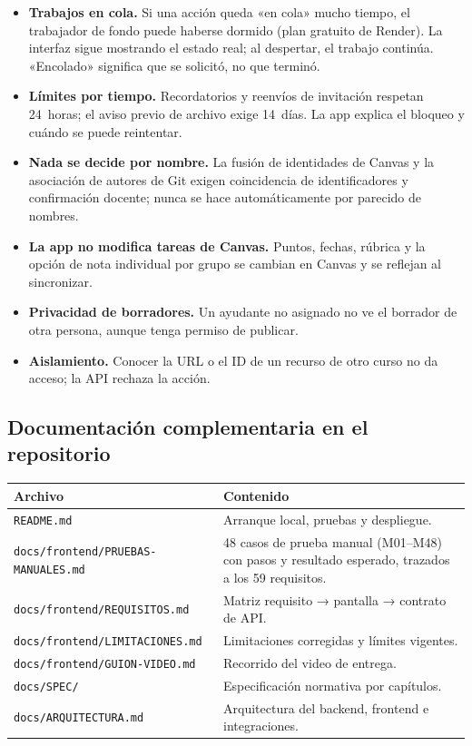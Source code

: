 \documentclass[11pt,a4paper]{article}
\begin{document}
\begin{itemize}
  \item \textbf{Trabajos en cola.} Si una acción queda «en cola» mucho tiempo, el trabajador de fondo puede haberse dormido (plan gratuito de Render). La interfaz sigue mostrando el estado real; al despertar, el trabajo continúa. «Encolado» significa que se solicitó, no que terminó.
  \item \textbf{Límites por tiempo.} Recordatorios y reenvíos de invitación respetan 24~horas; el aviso previo de archivo exige 14~días. La app explica el bloqueo y cuándo se puede reintentar.
  \item \textbf{Nada se decide por nombre.} La fusión de identidades de Canvas y la asociación de autores de Git exigen coincidencia de identificadores y confirmación docente; nunca se hace automáticamente por parecido de nombres.
  \item \textbf{La app no modifica tareas de Canvas.} Puntos, fechas, rúbrica y la opción de nota individual por grupo se cambian en Canvas y se reflejan al sincronizar.
  \item \textbf{Privacidad de borradores.} Un ayudante no asignado no ve el borrador de otra persona, aunque tenga permiso de publicar.
  \item \textbf{Aislamiento.} Conocer la URL o el ID de un recurso de otro curso no da acceso; la API rechaza la acción.
\end{itemize}

\subsection{Documentación complementaria en el repositorio}

\noindent\begin{tabularx}{\textwidth}{L{7.2cm} X}
\toprule
\textbf{Archivo} & \textbf{Contenido} \\
\midrule
\texttt{README.md} & Arranque local, pruebas y despliegue. \\
\texttt{docs/frontend/PRUEBAS-MANUALES.md} & 48 casos de prueba manual (M01–M48) con pasos y resultado esperado, trazados a los 59 requisitos. \\
\texttt{docs/frontend/REQUISITOS.md} & Matriz requisito → pantalla → contrato de API. \\
\texttt{docs/frontend/LIMITACIONES.md} & Limitaciones corregidas y límites vigentes. \\
\texttt{docs/frontend/GUION-VIDEO.md} & Recorrido del video de entrega. \\
\texttt{docs/SPEC/} & Especificación normativa por capítulos. \\
\texttt{docs/ARQUITECTURA.md} & Arquitectura del backend, frontend e integraciones. \\
\bottomrule
\end{tabularx}
\end{document}
